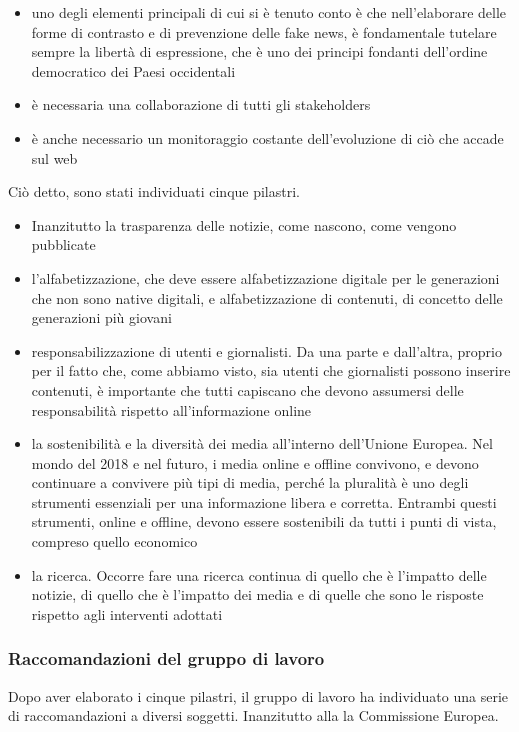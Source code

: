 \begin{itemize}
    \item uno degli elementi principali di cui si è tenuto conto è che nell'elaborare delle forme di contrasto e di prevenzione delle fake news, è fondamentale tutelare sempre la libertà di espressione, che è uno dei principi fondanti dell'ordine democratico dei Paesi occidentali
    \item è necessaria una collaborazione di tutti gli stakeholders
    \item è anche necessario un monitoraggio costante dell'evoluzione di ciò che accade sul web
\end{itemize}

Ciò detto, sono stati individuati cinque pilastri. 

\begin{itemize}
    \item Inanzitutto la trasparenza delle notizie, come nascono, come vengono pubblicate
    \item l'alfabetizzazione, che deve essere alfabetizzazione digitale per le generazioni che non sono native digitali, e alfabetizzazione di contenuti, di concetto delle generazioni più giovani
    \item responsabilizzazione di utenti e giornalisti. Da una parte e dall'altra, proprio per il fatto che, come abbiamo visto, sia utenti che giornalisti possono inserire contenuti, è importante che tutti capiscano che devono assumersi delle responsabilità rispetto all'informazione online
    \item la sostenibilità e la diversità dei media all'interno dell'Unione Europea. Nel mondo del 2018 e nel futuro, i media online e offline convivono, e devono continuare a convivere più tipi di media, perché la pluralità è uno degli strumenti essenziali per una informazione libera e corretta. Entrambi questi strumenti, online e offline, devono essere sostenibili da tutti i punti di vista, compreso quello economico
    \item la ricerca. Occorre fare una ricerca continua di quello che è l'impatto delle notizie, di quello che è l'impatto dei media e di quelle che sono le risposte rispetto agli interventi adottati
\end{itemize}

\subsubsection{Raccomandazioni del gruppo di lavoro}
Dopo aver elaborato i cinque pilastri, il gruppo di lavoro ha individuato una serie di raccomandazioni a diversi soggetti. 
Inanzitutto alla la Commissione Europea.

